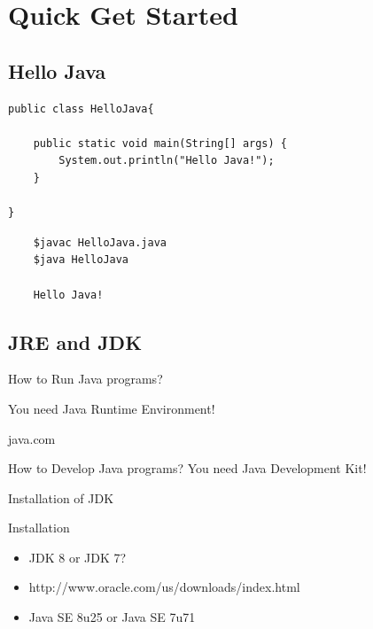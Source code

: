 \documentclass[UTF8]{beamer}
\begin{document}
\section{Quick Get Started}
\subsection{Hello Java}
\begin{frame}[fragile]
\begin{verbatim}
public class HelloJava{

    public static void main(String[] args) {
        System.out.println("Hello Java!");
    }

}
\end{verbatim}
\end{frame}

\begin{frame}[fragile]
  \begin{verbatim}
    $javac HelloJava.java
    $java HelloJava

    Hello Java!
  \end{verbatim}
\end{frame}

\subsection{JRE and JDK}
\begin{frame}{How to Run Java programs?}
  \centerline{You need Java Runtime Environment!}
  \centerline{java.com}
\end{frame}

\begin{frame}{How to Develop Java programs?}
  You need Java Development Kit!
\end{frame}

\begin{frame}[t]{Installation of JDK}
  \begin{block}{Installation}
    \begin{itemize}
      \item JDK 8 or JDK 7?
      \item http://www.oracle.com/us/downloads/index.html
      \item Java SE 8u25 or Java SE 7u71
    \end{itemize}
  \end{block}
\end{frame}
\end{document}
